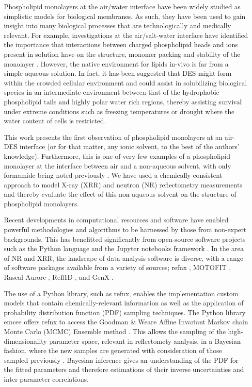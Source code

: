 \documentclass[amsmath,amssymb,twocolumn,superscriptaddress]{revtex4-1}
\begin{document}
Phospholipid monolayers at the air/water interface have been widely studied as simplistic models for biological membranes.
As such, they have been used to gain insight into many biological processes that are technologically and medically relevant.
For example, investigations at the air/salt-water interface have identified the importance that interactions between charged phospholipid heads and ions present in solution have on the structure, monomer packing and stability of the monolayer \cite{Mohwald1990,Kewalramani2010}.
However, the native environment for lipids in-vivo is far from a simple aqueous solution.
In fact, it has been suggested \cite{Dai2013,Hammond2017} that DES might form within the crowded cellular environment and could assist in solubilizing biological species in an intermediate environment between that of the hydrophobic phospholipid tails and highly polar water rich regions, thereby assisting survival under extreme conditions such as freezing temperatures or drought where the water content of cells is restricted.

This work presents the first observation of phospholipid monolayers at an air-DES interface (or for that matter, any ionic solvent, to the best of the authors' knowledge).
Furthermore, this is one of very few examples of a phospholipid monolayer at the interface between air and a non-aqueous solvent, with only formamide being noted previously \cite{Weinbach1993,Graner1995}.
We have used a chemically-consistent approach to model X-ray (XRR) and neutron (NR) reflectometry measurements and thereby evaluate the effect of this non-aqueous solvent on the structure of phospholipid monolayers.

Recent developments in computational resources and software have enabled powerful methodologies and algorithms to be harnessed by those from non-expert backgrounds.
This has benefitted significantly from open-source software projects such as the Python language \cite{vanRossum1995} and the Jupyter notebooks framework \cite{Kluyver2016}.
In the area of NR and XRR, the landscape of data-analysis software is diverse, with a range of software packages available from a variety of sources; refnx \cite{Nelson2018,Nelson2018a}, MOTOFIT \cite{Nelson2006}, Rascal \cite{HughesRascal} Aurore \cite{Gerelli2016}, Refl1D \cite{Kienzle2011}, and GenX \cite{Bjorck2007}.

The use of a Python library, such as refnx, enables the implementation custom models that contain chemically-relevant information as well as the application of probability distribution function (PDF) sampling techniques.
The Python library emcee \cite{Foreman-Mackey2013} offers refnx to access the Goodman \& Weare Affine Invariant Markov chain Monte Carlo (MCMC) Ensemble method \cite{Goodman2010}.
This allows the sampling of the high-dimensionality parameter space, relevant in reflectomety analysis, in a Bayesian fashion, where the new samples are generated with consideration of those sampled previously \cite{Sivia2006}.
Bayesian inference gives an understanding of the PDF for the fitted parameters and therefore estimations of their inverse uncertainties and inter-parameter correlations.
\end{document}
